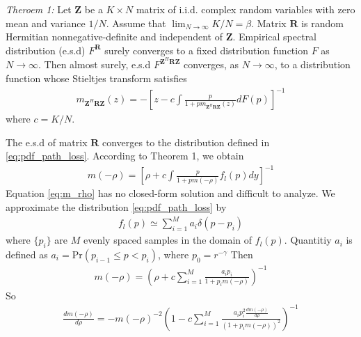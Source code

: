 \documentclass[12pt,journal,draftclsnofoot,onecolumn]{IEEEtran}
\begin{document}
\emph{Theroem 1:} Let $\mathbf{Z}$ be a $K \times N$ matrix of i.i.d. complex
random variables with zero mean and variance  $1/N$.  Assume
that $\lim_{N \to \infty}K/N = \beta$. Matrix $\mathbf{R}$ is random Hermitian
nonnegative-definite and independent of $\mathbf{Z}$. Empirical spectral distribution (e.s.d) $F^{\mathbf{R}}$ surely converges to a fixed distribution function $F$ as $N \to \infty$. Then almost surely, e.s.d $F^{\mathbf{Z}^H\mathbf{R}\mathbf{Z}}$ converges, as $N \to \infty$,
to a distribution function whose Stieltjes transform
satisfies
\begin{eqnarray}
m_{\mathbf{Z}^H\mathbf{R}\mathbf{Z}}(z) = -\left[z-c\int \frac{p}{1+pm_{\mathbf{Z}^H\mathbf{R}\mathbf{Z}}(z)}dF(p)\right]^{-1}
\end{eqnarray}
where $c = K/N$.

The e.s.d of matrix $\mathbf{R}$ converges to the distribution defined in \eqref{eq:pdf_path_loss}. According to Theorem 1, we obtain
\begin{eqnarray}
m(-\rho) = \left[\rho+c\int \frac{p}{1+pm(-\rho)}f_l(p)dy\right]^{-1} \label{eq:m_rho}
\end{eqnarray}
Equation \eqref{eq:m_rho} has no closed-form solution and difficult to analyze. We approximate the distribution \eqref{eq:pdf_path_loss} by
\begin{eqnarray}
f_l(p) \simeq \sum_{i = 1}^{M}a_i\delta(p - p_i)
\end{eqnarray}
where $\{p_i\}$ are $M$ evenly spaced samples in the domain of $f_l(p)$. Quantitiy $a_i$ is defined as $a_i = \mathrm{Pr}(p_{i-1}\leq p < p_{i})$, where $p_0 = r^{-\gamma}$
Then 
\begin{eqnarray}
m(-\rho) = \left(\rho + c\sum_{i=1}^{M}\frac{a_ip_i}{1 + p_im(-\rho)}\right)^{-1}
\end{eqnarray}
So
\begin{eqnarray}
\frac{dm(-\rho)}{d\rho} = -m(-\rho)^{-2}\left(1 - c\sum_{i=1}^{M}\frac{a_ip_i^2\frac{dm(-\rho)}{d\rho}}{(1 + p_im(-\rho))^2}\right)^{-1}
\end{eqnarray}
%
\end{document}
